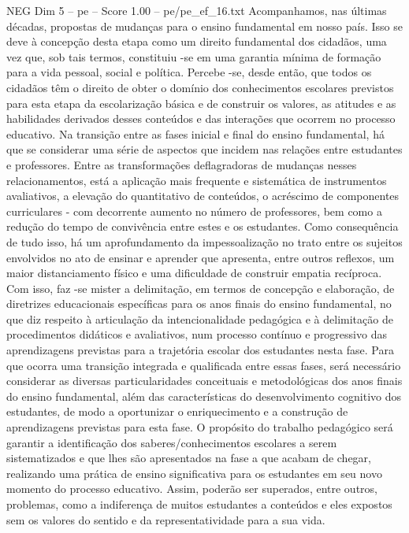 \begin{textsample}{NEG Dim 5 – pe – Score 1.00 – pe/pe\_ef\_16.txt}
Acompanhamos, nas últimas décadas, propostas de mudanças para o ensino fundamental em nosso país.
Isso se deve à concepção desta etapa como um direito fundamental dos cidadãos, uma vez que, sob tais termos, constituiu -se em uma garantia mínima de formação para a vida pessoal, social e política.
Percebe -se, desde então, que todos os cidadãos têm o direito de obter o domínio dos conhecimentos escolares previstos para esta etapa da escolarização básica e de construir os valores, as atitudes e as habilidades derivados desses conteúdos e das interações que ocorrem no processo educativo.
Na transição entre as fases inicial e final do ensino fundamental, há que se considerar uma série de aspectos que incidem nas relações entre estudantes e professores.
Entre as transformações deflagradoras de mudanças nesses relacionamentos, está a aplicação mais frequente e sistemática de instrumentos avaliativos, a elevação do quantitativo de conteúdos, o acréscimo de componentes curriculares - com decorrente aumento no número de professores, bem como a redução do tempo de convivência entre estes e os estudantes.
Como consequência de tudo isso, há um aprofundamento da impessoalização no trato entre os sujeitos envolvidos no ato de ensinar e aprender que apresenta, entre outros reflexos, um maior distanciamento físico e uma dificuldade de construir empatia recíproca.
Com isso, faz -se mister a delimitação, em termos de concepção e elaboração, de diretrizes educacionais específicas para os anos finais do ensino fundamental, no que diz respeito à articulação da intencionalidade pedagógica e à delimitação de procedimentos didáticos e avaliativos, num processo contínuo e progressivo das aprendizagens previstas para a trajetória escolar dos estudantes nesta fase.
Para que ocorra uma transição integrada e qualificada entre essas fases, será necessário considerar as diversas particularidades conceituais e metodológicas dos anos finais do ensino fundamental, além das características do desenvolvimento cognitivo dos estudantes, de modo a oportunizar o enriquecimento e a construção de aprendizagens previstas para esta fase.
O propósito do trabalho pedagógico será garantir a identificação dos saberes/conhecimentos escolares a serem sistematizados e que lhes são apresentados na fase a que acabam de chegar, realizando uma prática de ensino significativa para os estudantes em seu novo momento do processo educativo.
Assim, poderão ser superados, entre outros, problemas, como a indiferença de muitos estudantes a conteúdos e eles expostos sem os valores do sentido e da representatividade para a sua vida.

\end{textsample}
